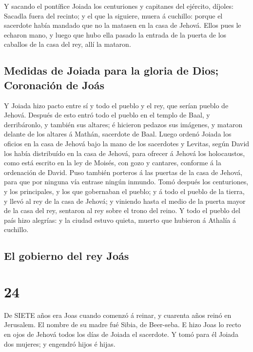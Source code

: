  Y sacando el pontífice Joiada los centuriones y capitanes
del ejército, díjoles: Sacadla fuera del recinto; y el que la siguiere,
muera á cuchillo: porque el sacerdote había mandado que no la matasen en
la casa de Jehová.  Ellos pues le echaron mano, y luego que
hubo ella pasado la entrada de la puerta de los caballos de la casa del
rey, allí la mataron.

\hypertarget{medidas-de-joiada-para-la-gloria-de-dios-coronaciuxf3n-de-jouxe1s}{%
\subsection{Medidas de Joiada para la gloria de Dios; Coronación de
Joás}\label{medidas-de-joiada-para-la-gloria-de-dios-coronaciuxf3n-de-jouxe1s}}

 Y Joiada hizo pacto entre sí y todo el pueblo y el rey,
que serían pueblo de Jehová.  Después de esto entró todo el
pueblo en el templo de Baal, y derribáronlo, y también sus altares; é
hicieron pedazos sus imágenes, y mataron delante de los altares á
Mathán, sacerdote de Baal.  Luego ordenó Joiada los oficios
en la casa de Jehová bajo la mano de los sacerdotes y Levitas, según
David los había distribuído en la casa de Jehová, para ofrecer á Jehová
los holocaustos, como está escrito en la ley de Moisés, con gozo y
cantares, conforme á la ordenación de David.  Puso también
porteros á las puertas de la casa de Jehová, para que por ninguna vía
entrase ningún inmundo.  Tomó después los centuriones, y
los principales, y los que gobernaban el pueblo; y á todo el pueblo de
la tierra, y llevó al rey de la casa de Jehová; y viniendo hasta el
medio de la puerta mayor de la casa del rey, sentaron al rey sobre el
trono del reino.  Y todo el pueblo del país hizo alegrías:
y la ciudad estuvo quieta, muerto que hubieron á Athalía á cuchillo.

\hypertarget{el-gobierno-del-rey-jouxe1s}{%
\subsection{El gobierno del rey
Joás}\label{el-gobierno-del-rey-jouxe1s}}

\hypertarget{section-23}{%
\section{24}\label{section-23}}

 De SIETE años era Joas cuando comenzó á reinar, y cuarenta
años reinó en Jerusalem. El nombre de su madre fué Sibia, de Beer-seba.
 E hizo Joas lo recto en ojos de Jehová todos los días de
Joiada el sacerdote.  Y tomó para él Joiada dos mujeres; y
engendró hijos é hijas.

